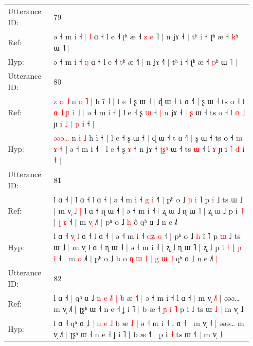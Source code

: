 \documentclass[10pt]{article}
\DeclareRobustCommand{\hl}[1]{{\textcolor{red}{#1}}}
\begin{document}
\begin{longtable}{ll}
 \\
\midrule
Utterance ID: & 79 \\
Ref: & ə ˧ m i ˧\hl{ }\hl{|} \hl{l} ɑ ˧ l e ˧ \hl{ʈ}ʰ æ ˧\hl{ }\hl{z}\hl{ }\hl{e}\hl{ }˥ | n jɤ ˧\hl{} | tʰ i ˧ ʈʰ æ ˧ \hl{k}ʰ ɯ ˥ |
 \\
Hyp: & ə ˧ m i ˧\hl{}\hl{} \hl{ŋ} ɑ ˧ l e ˧ \hl{t}ʰ æ ˧\hl{}\hl{}\hl{}\hl{}\hl{}˥ | n jɤ ˧\hl{˥} | tʰ i ˧ ʈʰ æ ˧ \hl{p}ʰ ɯ ˥ |
 \\
\midrule
Utterance ID: & 80 \\
Ref: & \hl{z}\hl{ }\hl{o}\hl{ }\hl{˩} n\hl{ }\hl{o} \hl{˥} \hl{|} h ĩ ˧ | l e ˧ ʂ ɯ ˧ | ɖ ɯ ˧ t ɑ ˧˥ | ʂ ɯ ˧ ts o ˧\hl{ }\hl{l}\hl{ }\hl{ɑ}\hl{ }\hl{˩} \hl{ɲ} \hl{i} \hl{˩} | ə ˧ m i ˧ | l e ˧ ʂ \hl{ɯ} ˧\hl{ }\hl{|} n jɤ ˧ \hl{|}\hl{ }\hl{ʂ} ɯ ˧ ts \hl{o} ˧ l\hl{ }\hl{ɑ} \hl{˩} ɲ i\hl{ }\hl{˩} \hl{|} \hl{p} i ˧ |
 \\
Hyp: & \hl{}\hl{ə}\hl{ə}\hl{ə}\hl{…} n\hl{}\hl{} \hl{i} \hl{˩} h ĩ ˧ | l e ˧ ʂ ɯ ˧ | ɖ ɯ ˧ t ɑ ˧˥ | ʂ ɯ ˧ ts o ˧\hl{}\hl{}\hl{}\hl{}\hl{}\hl{} \hl{m} \hl{ɤ} \hl{˧} | ə ˧ m i ˧ | l e ˧ ʂ \hl{ɤ} ˧\hl{}\hl{} n jɤ ˧ \hl{ʈ}\hl{ʂ}\hl{ʰ} ɯ ˧ ts \hl{ɯ} ˧ l\hl{}\hl{} \hl{ɤ} ɲ i\hl{}\hl{} \hl{˥} \hl{d} i ˧ |
 \\
\midrule
Utterance ID: & 81 \\
Ref: & l ɑ ˧ \hl{}\hl{|} l ɑ ˧ l ɑ ˧ | ə ˧ m i ˧ \hl{}\hl{g} \hl{i} ˧\hl{˥} | pʰ o ˩ \hl{ɲ} i\hl{} ˥ p \hl{i} ˩ ts ɯ ˩ | m v̩\hl{ }\hl{˩}\hl{ }\hl{|} l ɑ ˧ ɳ ɯ ˧ | ə ˧ m i ˧ | ʐ\hl{ }\hl{ɯ} ˩ ɳ ɯ ˥ | ʐ\hl{ }\hl{ɯ} ˩ p i \hl{˥} | \hl{ʈ} \hl{ɤ} ˧ | m \hl{v}\hl{̩} ˩˥ | pʰ o ˩ \hl{h} o\hl{}\hl{}\hl{}\hl{}\hl{}\hl{}\hl{}\hl{}\hl{}\hl{}\hl{}\hl{}\hl{}\hl{̃} qʰ ɑ ˩ n e ˩˥\hl{}\hl{}
 \\
Hyp: & l ɑ ˧ \hl{v}\hl{̩} l ɑ ˧ l ɑ ˧ | ə ˧ m i ˧ \hl{d}\hl{ʑ} \hl{o} ˧\hl{} | pʰ o ˩ \hl{h} i\hl{̃} ˥ p \hl{ɯ} ˩ ts ɯ ˩ | m v̩\hl{}\hl{}\hl{}\hl{} l ɑ ˧ ɳ ɯ ˧ | ə ˧ m i ˧ | ʐ\hl{}\hl{} ˩ ɳ ɯ ˥ | ʐ\hl{}\hl{} ˩ p i \hl{˧} | \hl{p} \hl{i} ˧ | m \hl{}\hl{o} ˩˥ | pʰ o ˩ \hl{b} o\hl{ }\hl{ɳ}\hl{ }\hl{ɯ}\hl{ }\hl{˩}\hl{ }\hl{|}\hl{ }\hl{g}\hl{ }\hl{ɯ}\hl{ }\hl{˩} qʰ ɑ ˩ n e ˩˥\hl{ }\hl{|}
 \\
\midrule
Utterance ID: & 82 \\
Ref: & l ɑ ˧\hl{ }\hl{|} qʰ ɑ ˩ \hl{n} \hl{e} \hl{˩}\hl{˥} \hl{|} b æ \hl{˧}\hl{˥} | ə ˧ m i ˧ l ɑ ˧ | m v̩ \hl{˩}\hl{˥} | əəə… m v̩ ˩˥ | ʈʂʰ ɯ ˧ n e ˧ ʝ i ˥ | b æ ˧\hl{ }\hl{ɲ}\hl{ }\hl{i} \hl{˥} p i \hl{˩} ts ɯ \hl{}\hl{˩} | m v̩ ˩
 \\
Hyp: & l ɑ ˧\hl{}\hl{} qʰ ɑ ˩ \hl{|} \hl{n} \hl{}\hl{e} \hl{˩} b æ \hl{}\hl{˩} | ə ˧ m i ˧ l ɑ ˧ | m v̩ \hl{}\hl{˧} | əəə… m v̩ ˩˥ | ʈʂʰ ɯ ˧ n e ˧ ʝ i ˥ | b æ ˧\hl{}\hl{}\hl{}\hl{˥} \hl{|} p i \hl{˧} ts ɯ \hl{˧}\hl{˥} | m v̩ ˩

\end{longtable}
\end{document}
